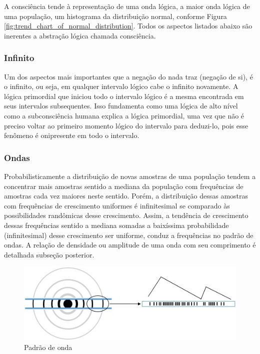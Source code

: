 A consciência tende à representação de uma onda lógica, a maior onda lógica de uma população, um histograma da distribuição normal, conforme Figura \ref{fig:trend_chart_of_normal_distribution}. Todos os aspectos listados abaixo são inerentes a abstração lógica chamada consciência.

\subsubsection{Infinito}
Um dos aspectos mais importantes que a negação do nada traz (negação de si), é o infinito, ou seja, em qualquer intervalo lógico cabe o infinito novamente. A lógica primordial que iniciou todo o intervalo lógico é a mesma encontrada em seus intervalos subsequentes. Isso fundamenta como uma lógica de alto nível como a subconsciência humana explica a lógica primordial, uma vez que não é preciso voltar ao primeiro momento lógico do intervalo para deduzi-lo, pois esse fenômeno é onipresente em todo o intervalo.

\subsubsection{Ondas}
Probabilisticamente a distribuição de novas amostras de uma população tendem a concentrar mais amostras sentido a mediana da população com frequências de amostras cada vez maiores neste sentido. Porém, a distribuição dessas amostras com frequências de crescimento uniformes é infinitesimal se comparado às possibilidades randômicas desse crescimento. Assim, a tendência de crescimento dessas frequências sentido a mediana somadas a baixíssima probabilidade (infinitesimal) desse crescimento ser uniforme, conduz a frequências no padrão de ondas. A relação de densidade ou amplitude de uma onda com seu comprimento é detalhada subseção posterior.
	\begin{figure}[H]
	\caption{Padrão de onda}
	\label{fig:consciousness_waves}
	\centering
	\includegraphics[scale=.8]{sections/images/consciousness_waves.jpg}
	\end{figure}

